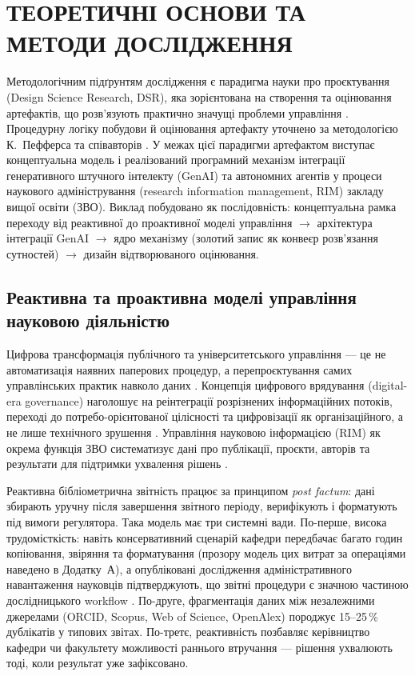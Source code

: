 \section*{ТЕОРЕТИЧНІ ОСНОВИ ТА МЕТОДИ ДОСЛІДЖЕННЯ}

Методологічним підґрунтям дослідження є парадигма науки про проєктування (Design Science Research, DSR), яка зорієнтована на створення та оцінювання артефактів, що розв'язують практично значущі проблеми управління \cite{Hevner2004DSR}. Процедурну логіку побудови й оцінювання артефакту уточнено за методологією К.~Пефферса та співавторів \cite{Peffers2007DSRMeth}. У межах цієї парадигми артефактом виступає концептуальна модель і реалізований програмний механізм інтеграції генеративного штучного інтелекту (GenAI) та автономних агентів у процеси наукового адміністрування (research information management, RIM) закладу вищої освіти (ЗВО). Виклад побудовано як послідовність: концептуальна рамка переходу від реактивної до проактивної моделі управління $\rightarrow$ архітектура інтеграції GenAI $\rightarrow$ ядро механізму (золотий запис як конвеєр розв'язання сутностей) $\rightarrow$ дизайн відтворюваного оцінювання.

\subsection*{Реактивна та проактивна моделі управління науковою діяльністю}

Цифрова трансформація публічного та університетського управління — це не автоматизація наявних паперових процедур, а перепроєктування самих управлінських практик навколо даних \cite{Mergel2019DefiningDigitalTransformation}. Концепція цифрового врядування (digital-era governance) наголошує на реінтеграції розрізнених інформаційних потоків, переході до потребо-орієнтованої цілісності та цифровізації як організаційного, а не лише технічного зрушення \cite{Dunleavy2006DigitalEraGovernance}. Управління науковою інформацією (RIM) як окрема функція ЗВО систематизує дані про публікації, проєкти, авторів та результати для підтримки ухвалення рішень \cite{Bryant2017RIMDefining}.

Реактивна бібліометрична звітність працює за принципом \emph{post factum}: дані збирають уручну після завершення звітного періоду, верифікують і форматують під вимоги регулятора. Така модель має три системні вади. По-перше, висока трудомісткість: навіть консервативний сценарій кафедри передбачає багато годин копіювання, звіряння та форматування (прозору модель цих витрат за операціями наведено в Додатку~А), а опубліковані дослідження адміністративного навантаження науковців підтверджують, що звітні процедури є значною частиною дослідницького workflow \cite{Rockwell2009FDPBurden}. По-друге, фрагментація даних між незалежними джерелами (ORCID, Scopus, Web of Science, OpenAlex) породжує 15--25\,\% дублікатів у типових звітах. По-третє, реактивність позбавляє керівництво кафедри чи факультету можливості раннього втручання — рішення ухвалюють тоді, коли результат уже зафіксовано.

